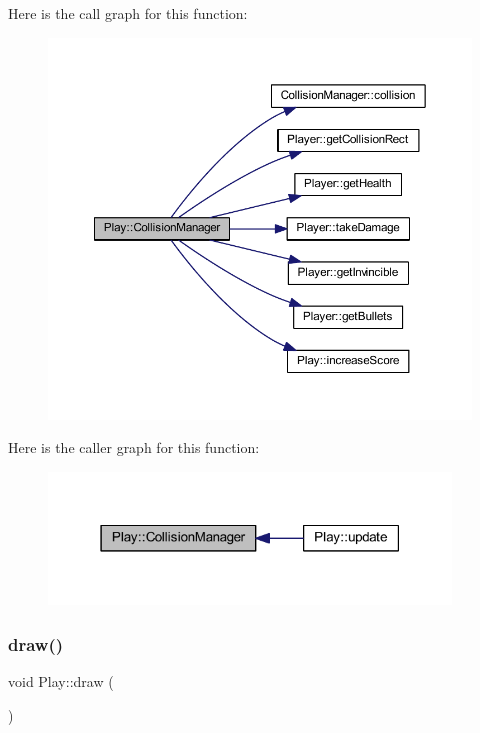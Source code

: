 Here is the call graph for this function\+:
\nopagebreak
\begin{figure}[H]
\begin{center}
\leavevmode
\includegraphics[width=350pt]{class_play_a3dbdeaf231718f05feac075aa4902175_cgraph}
\end{center}
\end{figure}
Here is the caller graph for this function\+:
\nopagebreak
\begin{figure}[H]
\begin{center}
\leavevmode
\includegraphics[width=303pt]{class_play_a3dbdeaf231718f05feac075aa4902175_icgraph}
\end{center}
\end{figure}
\mbox{\label{class_play_a026d1354c1b7ac0df50b7108c78aec61}} 
\subsubsection{\texorpdfstring{draw()}{draw()}}
{\footnotesize\ttfamily void Play\+::draw (\begin{DoxyParamCaption}{ }\end{DoxyParamCaption})\hspace{0.3cm}{\ttfamily [virtual]}}



